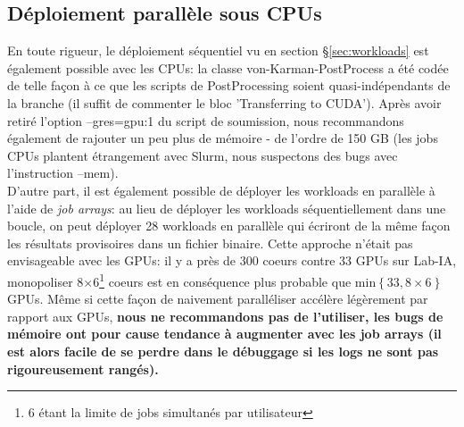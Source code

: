 \documentclass[13pt, a4paper]{extarticle}
\begin{document}
\subsection{Déploiement parallèle sous CPUs}
\noindent En toute rigueur, le déploiement séquentiel vu en section \S \ref{sec:workloads}
est également possible avec les CPUs: la classe von-Karman-PostProcess a été codée
de telle façon à ce que les scripts de PostProcessing soient quasi-indépendants de la branche
(il suffit de commenter le bloc 'Transferring to CUDA'). Après avoir retiré l'option
--gres=gpu:1 du script de soumission, nous recommandons également de rajouter un peu
plus de mémoire - de l'ordre de 150 GB (les jobs CPUs plantent étrangement avec Slurm,
nous suspectons des bugs avec l'instruction --mem). \\
D'autre part, il est également possible de déployer les workloads en parallèle 
à l'aide de \emph{job arrays}: au lieu de déployer les workloads séquentiellement dans
une boucle, on peut déployer 28 workloads en parallèle qui écriront de la même façon 
les résultats provisoires dans un fichier binaire. Cette approche n'était pas envisageable
avec les GPUs: il y a près de 300 coeurs contre 33 GPUs sur Lab-IA, 
monopoliser 8$\times$6\footnote{6 étant la limite de jobs simultanés par utilisateur} coeurs
est en conséquence plus probable que $\mathrm{min}\left\{33,8\times 6\right\}$ GPUs. 
Même si cette façon de naivement paralléliser 
accélère légèrement par rapport aux GPUs, {\bf nous ne recommandons pas de l'utiliser,
les bugs de mémoire ont pour cause tendance à augmenter avec les job arrays (il est 
alors facile de se perdre dans le débuggage si les logs ne sont pas rigoureusement rangés).}





\end{document}
